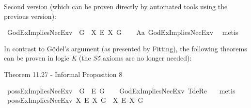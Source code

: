 \begin{isabellebody}
\isamarkupfalse%
%
\endisatagproof
{\isafoldproof}%
%
\isadelimproof
%
\endisadelimproof
%
\begin{isamarkuptext}%
Second version (which can be proven directly by automated tools using the previous version):%
\end{isamarkuptext}\isamarkuptrue%
\isamarkupfalse%
\ GodExImpliesNecEx{\isacharunderscore}v{}{\isacharcolon}\ {\isachardoublequoteopen}{\isasymlfloor}\isactrlbold {\isasymexists}\ \isactrlbold {\isasymdown}G\ \isactrlbold {\isasymrightarrow}\ {\isacharparenleft}{\isacharparenleft}{\isasymlambda}X{\isachardot}\ \isactrlbold {\isasymbox}\isactrlbold {\isasymexists}\isactrlsup E\ X{\isacharparenright}\ \isactrlbold {\isasymdown}G{\isacharparenright}{\isasymrfloor}{\isachardoublequoteclose}\isanewline
%
\isadelimproof
\ \ %
\endisadelimproof
%
\isatagproof
{}\isamarkupfalse%
\ A{}a\ GodExImpliesNecEx{\isacharunderscore}v{}\ \isamarkupfalse%
\ metis%
\endisatagproof
{\isafoldproof}%
%
\isadelimproof
%
\endisadelimproof
%
\begin{isamarkuptext}%
In contrast to G\"odel's argument (as presented by Fitting), the following theorems can be proven in logic \emph{K}
 (the \emph{S5} axioms are no longer needed):%
\end{isamarkuptext}\isamarkuptrue%
%
\begin{isamarkuptext}%
Theorem 11.27 - Informal Proposition 8%
\end{isamarkuptext}\isamarkuptrue%
\isamarkupfalse%
\ possExImpliesNecEx{\isacharunderscore}v{}{\isacharcolon}\ {\isachardoublequoteopen}{\isasymlfloor}\isactrlbold {\isasymdiamond}\isactrlbold {\isasymexists}\ \isactrlbold {\isasymdown}G\ \isactrlbold {\isasymrightarrow}\ \isactrlbold {\isasymbox}\isactrlbold {\isasymexists}\isactrlsup E\ \isactrlbold {\isasymdown}G{\isasymrfloor}{\isachardoublequoteclose}\isanewline
%
\isadelimproof
\ \ %
\endisadelimproof
%
\isatagproof
{}\isamarkupfalse%
\ GodExImpliesNecEx{\isacharunderscore}v{}\ T{}{\isacharunderscore}deRe\ \ \isamarkupfalse%
\ metis%
\endisatagproof
{\isafoldproof}%
%
\isadelimproof
\isanewline
%
\endisadelimproof
{}\isamarkupfalse%
\ possExImpliesNecEx{\isacharunderscore}v{}{\isacharcolon}\ {\isachardoublequoteopen}{\isasymlfloor}{\isacharparenleft}{\isasymlambda}X{\isachardot}\ \isactrlbold {\isasymdiamond}\isactrlbold {\isasymexists}\isactrlsup E\ X{\isacharparenright}\ \isactrlbold {\isasymdown}G\ \isactrlbold {\isasymrightarrow}\ {\isacharparenleft}{\isacharparenleft}{\isasymlambda}X{\isachardot}\ \isactrlbold {\isasymbox}\isactrlbold {\isasymexists}\isactrlsup E\ X{\isacharparenright}\ \isactrlbold {\isasymdown}G{\isacharparenright}{\isasymrfloor}{\isachardoublequoteclose}\isanewline

\end{isabellebody}
